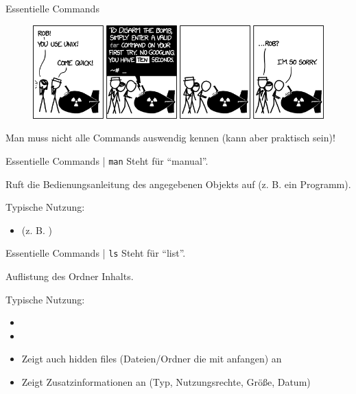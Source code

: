 \documentclass{setbeamer}
\begin{document}
\begin{frame}{Essentielle Commands}
    \begin{figure}[h]
        \includegraphics[width=14.5cm, keepaspectratio]{./resources/tar.png}
        \caption*{}
    \end{figure}


    \pause
    \centering
    Man muss nicht alle Commands auswendig kennen (kann aber praktisch sein)!
\end{frame}

\begin{frame}{Essentielle Commands | \texttt{man}}
    Steht für ``manual''.

    \vspace{0.3cm}

    Ruft die Bedienungsanleitung des angegebenen Objekts auf (z. B. ein Programm).

    \vspace{0.3cm}

    Typische Nutzung:
    \begin{itemize}
        \item {} (z. B. )
    \end{itemize}
\end{frame}

\begin{frame}{Essentielle Commands | \texttt{ls}}
    Steht für ``list''.

    \vspace{0.3cm}

    Auflistung des Ordner Inhalts.

    \vspace{0.3cm}

    Typische Nutzung:
    \begin{itemize}
        \item {}
        \item {}
        \item {}\textemdash Zeigt auch hidden files (Dateien/Ordner die mit  anfangen) an
        \item {}\textemdash Zeigt Zusatzinformationen an (Typ, Nutzungsrechte, Größe, Datum)
    \end{itemize}
\end{frame}
\end{document}
